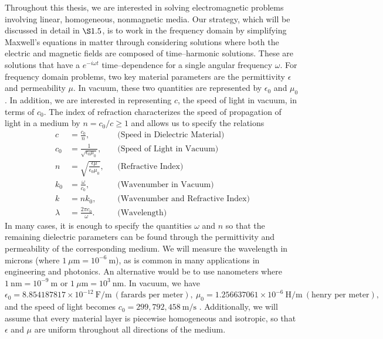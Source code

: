 Throughout this thesis, we are interested in solving electromagnetic problems involving linear, homogeneous, nonmagnetic media. Our strategy, which will be discussed in detail in $\S 1.5$, is to work in the frequency domain by simplifying Maxwell's equations in matter through considering solutions where both the electric and magnetic fields are composed of time--harmonic solutions. These are solutions that have a $e^{-i\omega t}$ time--dependence for a single angular frequency $\omega$. For frequency domain problems, two key material parameters are the permittivity $\epsilon$ and permeability $\mu$. In vacuum, these two quantities are represented by $\epsilon_0$ and $\mu_0$. In addition, we are interested in representing $c$, the speed of light in vacuum, in terms of $c_0$. The index of refraction characterizes the speed of propagation of light in a medium by $n = c_0/c \ge 1$ and allows us to specify the relations
\begin{align*}
c &= \frac{c_0}{n}, &&\text{(Speed in Dielectric Material)}\\
c_0 &= \frac{1}{\sqrt{\epsilon_0\mu_0}}, &&\text{(Speed of Light in Vacuum)}\\
n &= \sqrt{\frac{\epsilon\mu}{\epsilon_0\mu_0}}, &&\text{(Refractive Index)}\\
k_0 &= \frac{\omega}{c_0}, &&\text{(Wavenumber in Vacuum)}\\
k &= nk_0, &&\text{(Wavenumber and Refractive Index)}\\
\lambda &= \frac{2\pi c_0}{\omega}. &&\text{(Wavelength)}
\end{align*}
In many cases, it is enough to specify the quantities $\omega$ and  $n$ so that the remaining dielectric parameters can be found through the permittivity and permeability of the corresponding medium. We will measure the wavelength in microns (where $1 ~\mu \text{m} = 10^{-6}~\text{m}$), as is common in many applications in engineering and photonics. An alternative would be to use nanometers where $1 ~\text{nm} = 10^{-9}~\text{m}$ or $1 ~\mu\text{m} = 10^{3}~\text{nm}$. In vacuum, we have $\epsilon_0 = 8.854187817 \times 10^{-12}~ \text{F/m}~ (\text{farards per meter}), ~\mu_0 = 1.256637061 \times 10^{-6} ~\text{H/m}~ (\text{henry per meter}),$ and the speed of light becomes $c_0 = 299,792,458~\text{m/s}$ \cite{halliday2013fundamentals}. Additionally, we will assume that every material layer is piecewise homogeneous and isotropic, so that $\epsilon$ and $\mu$ are uniform throughout all directions of the medium.